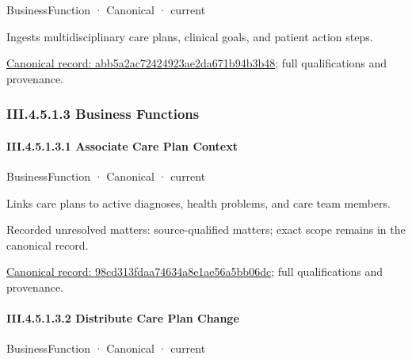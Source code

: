 \label{element:abb5a2ac72424923ae2da671b94b3b48}
{\small BusinessFunction · Canonical · current}\par

Ingests multidisciplinary care plans, clinical goals, and patient action steps.


{\footnotesize \href{../../../../continuum/business/business-function/abb5a2ac72424923ae2da671b94b3b48.md}{Canonical record: abb5a2ac72424923ae2da671b94b3b48}; full qualifications and provenance.}\par
\subsubsection*{III.4.5.1.3 Business Functions}
\label{navigation:III.4.5.1.3}

\paragraph*{III.4.5.1.3.1 Associate Care Plan Context}
\label{navigation:III.4.5.1.3.1}

\label{element:98cd313fdaa74634a8e1ae56a5bb06dc}
{\small BusinessFunction · Canonical · current}\par

Links care plans to active diagnoses, health problems, and care team members.


{\small Recorded unresolved matters: source-qualified matters; exact scope remains in the canonical record.}\par
{\footnotesize \href{../../../../continuum/business/business-function/98cd313fdaa74634a8e1ae56a5bb06dc.md}{Canonical record: 98cd313fdaa74634a8e1ae56a5bb06dc}; full qualifications and provenance.}\par
\paragraph*{III.4.5.1.3.2 Distribute Care Plan Change}
\label{navigation:III.4.5.1.3.2}

\label{element:cbfa51308103418a9dffe23a2d8cfd87}
{\small BusinessFunction · Canonical · current}\par


